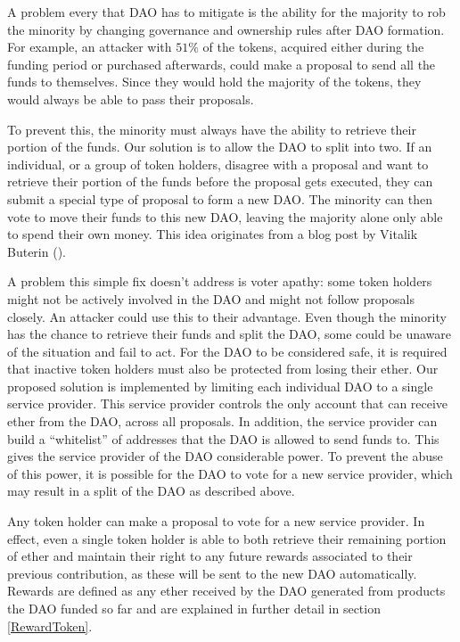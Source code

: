 \documentclass[9pt,oneside]{amsart}
\begin{document}
\begin{multicols}{2}
A problem every that DAO has to mitigate is the ability for the majority to rob the minority by changing governance and ownership rules after DAO formation.  For example, an attacker with $51\%$ of the tokens, acquired either during the funding period or purchased afterwards, could make a proposal to send all the funds to themselves. Since they would hold the majority of the tokens, they would always be able to pass their proposals.

To prevent this, the minority must always have the ability to retrieve their portion of the funds.  Our solution is to allow the DAO to split into two. If an individual, or a group of token holders, disagree with a proposal and want to retrieve their portion of the funds before the proposal gets executed, they can submit a special type of proposal to form a new DAO. The minority can then vote to move their funds to this new DAO, leaving the majority alone only able to spend their own money.
This idea originates from a blog post by Vitalik Buterin (\cite{Vitalik2015subjectivity}). 

A problem this simple fix doesn't address is voter apathy: some token holders might not be actively involved in the DAO and might not follow proposals closely. An attacker could use this to their advantage. Even though the minority has the chance to retrieve their funds and split the DAO, some could be unaware of the situation and fail to act. For the DAO to be considered safe, it is required that inactive token holders must also be protected from losing their ether. Our proposed solution is implemented by limiting each individual DAO to a single service provider. This service provider controls the only account that can receive ether from the DAO, across all proposals. In addition, the service provider can build a “whitelist” of addresses that the DAO is allowed to send funds to. This gives the service provider of the DAO considerable power. To prevent the abuse of this power, it is possible for the DAO to vote for a new service provider, which may result in a split of the DAO as described above. 

Any token holder can make a proposal to vote for a new service provider. In effect, even a single token holder is able to both retrieve their remaining portion of ether and maintain their right to any future rewards associated to their previous contribution, as these will be sent to the new DAO automatically. Rewards are defined as any ether received by the DAO generated from products the DAO funded so far and are explained in further detail in section \ref{RewardToken}.


\end{multicols}
\end{document}
